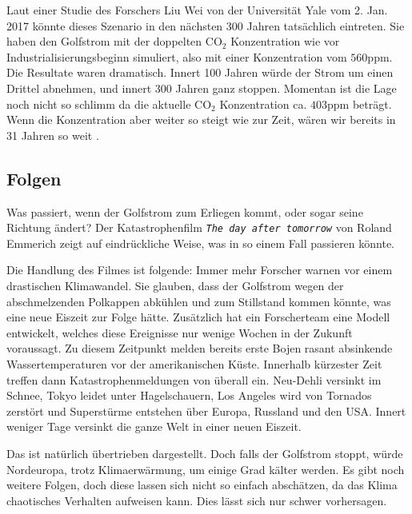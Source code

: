 Laut einer Studie des Forschers Liu Wei von der Universität Yale vom 2. Jan. 2017 \cite{thermohalin:liuwei} könnte dieses Szenario in den nächsten 300 Jahren tatsächlich eintreten. Sie haben den Golfstrom mit der doppelten $\text{CO}_2$ Konzentration wie vor Industrialisierungsbeginn simuliert, also mit einer Konzentration vom $560\text{ppm}$. Die Resultate waren dramatisch. Innert 100 Jahren würde der Strom um einen Drittel abnehmen, und innert 300 Jahren ganz stoppen. Momentan ist die Lage noch nicht so schlimm da die aktuelle $\text{CO}_2$ Konzentration ca. $403\text{ppm}$ \cite{thermohalin:co2} beträgt. Wenn die Konzentration aber weiter so steigt wie zur Zeit, wären wir bereits in 31 Jahren so weit .

\subsection{Folgen}

Was passiert, wenn der Golfstrom zum Erliegen kommt, oder sogar seine Richtung ändert?
Der Katastrophenfilm \texttt{\em{The day after tomorrow}} von Roland Emmerich zeigt auf eindrückliche Weise, was in so einem Fall passieren könnte. 

Die Handlung des Filmes ist folgende: Immer mehr Forscher warnen vor einem drastischen Klimawandel. Sie glauben, dass der Golfstrom wegen der abschmelzenden Polkappen abkühlen und zum Stillstand kommen könnte, was eine neue Eiszeit zur Folge hätte. Zusätzlich hat ein Forscherteam eine Modell entwickelt, welches diese Ereignisse nur wenige Wochen in der Zukunft voraussagt. Zu diesem Zeitpunkt melden bereits erste Bojen rasant absinkende Wassertemperaturen vor der amerikanischen Küste. Innerhalb kürzester Zeit treffen dann Katastrophenmeldungen von überall ein. Neu-Dehli versinkt im Schnee, Tokyo leidet unter Hagelschauern, Los Angeles wird von Tornados zerstört und Superstürme entstehen über Europa, Russland und den USA. 
Innert weniger Tage versinkt die ganze Welt in einer neuen Eiszeit. 

Das ist natürlich übertrieben dargestellt. Doch falls der Golfstrom stoppt, würde Nordeuropa, trotz Klimaerwärmung, um einige Grad kälter werden. Es gibt noch weitere Folgen, doch diese lassen sich nicht so einfach abschätzen, da das Klima chaotisches Verhalten aufweisen kann. Dies lässt sich nur schwer vorhersagen.

